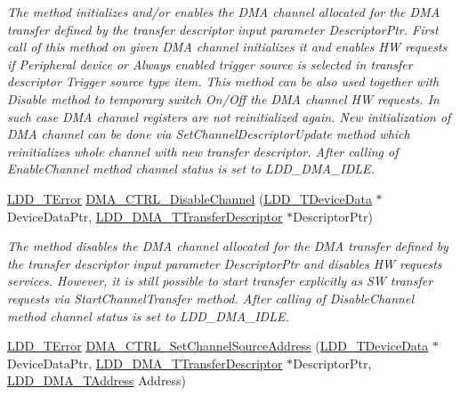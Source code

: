 \begin{DoxyCompactItemize}
\begin{DoxyCompactList}\small\item\em The method initializes and/or enables the D\-M\-A channel allocated for the D\-M\-A transfer defined by the transfer descriptor input parameter Descriptor\-Ptr. First call of this method on given D\-M\-A channel initializes it and enables H\-W requests if Peripheral device or Always enabled trigger source is selected in transfer descriptor Trigger source type item. This method can be also used together with Disable method to temporary switch On/\-Off the D\-M\-A channel H\-W requests. In such case D\-M\-A channel registers are not reinitialized again. New initialization of D\-M\-A channel can be done via Set\-Channel\-Descriptor\-Update method which reinitializes whole channel with new transfer descriptor. After calling of Enable\-Channel method channel status is set to L\-D\-D\-\_\-\-D\-M\-A\-\_\-\-I\-D\-L\-E. \end{DoxyCompactList}\item 
\hyperlink{group___p_e___types__module_ga24c2b045fd04e79e85f261ce4df35588}{L\-D\-D\-\_\-\-T\-Error} \hyperlink{group___d_m_a___c_t_r_l__module_ga80ab4c932d2e7d3c9a9af041fa8fa6de}{D\-M\-A\-\_\-\-C\-T\-R\-L\-\_\-\-Disable\-Channel} (\hyperlink{group___p_e___types__module_gac5cf1362f1f0e3a2ce71b1bf2276d091}{L\-D\-D\-\_\-\-T\-Device\-Data} $\ast$Device\-Data\-Ptr, \hyperlink{struct_l_d_d___d_m_a___t_transfer_descriptor}{L\-D\-D\-\_\-\-D\-M\-A\-\_\-\-T\-Transfer\-Descriptor} $\ast$Descriptor\-Ptr)
\begin{DoxyCompactList}\small\item\em The method disables the D\-M\-A channel allocated for the D\-M\-A transfer defined by the transfer descriptor input parameter Descriptor\-Ptr and disables H\-W requests services. However, it is still possible to start transfer explicitly as S\-W transfer requests via Start\-Channel\-Transfer method. After calling of Disable\-Channel method channel status is set to L\-D\-D\-\_\-\-D\-M\-A\-\_\-\-I\-D\-L\-E. \end{DoxyCompactList}\item 
\hyperlink{group___p_e___types__module_ga24c2b045fd04e79e85f261ce4df35588}{L\-D\-D\-\_\-\-T\-Error} \hyperlink{group___d_m_a___c_t_r_l__module_gad8a42d75e916ffb25a8e4dc019e41c70}{D\-M\-A\-\_\-\-C\-T\-R\-L\-\_\-\-Set\-Channel\-Source\-Address} (\hyperlink{group___p_e___types__module_gac5cf1362f1f0e3a2ce71b1bf2276d091}{L\-D\-D\-\_\-\-T\-Device\-Data} $\ast$Device\-Data\-Ptr, \hyperlink{struct_l_d_d___d_m_a___t_transfer_descriptor}{L\-D\-D\-\_\-\-D\-M\-A\-\_\-\-T\-Transfer\-Descriptor} $\ast$Descriptor\-Ptr, \hyperlink{group___p_e___types__module_gab8287f62db7ff96992355760b652cd07}{L\-D\-D\-\_\-\-D\-M\-A\-\_\-\-T\-Address} Address)

\end{DoxyCompactItemize}
